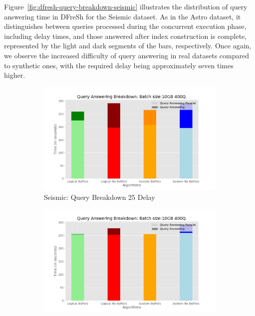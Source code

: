 %
Figure~\ref{fig:dfresh-query-breakdown-seismic} illustrates the distribution of query 
answering time in DFreSh for the Seismic dataset. As in the Astro dataset, it
distinguishes between queries processed during the concurrent execution phase,
including delay times, and those answered after index construction is complete,
represented by the light and dark segments of the bars, respectively. Once again,
we observe the increased difficulty of query answering in real datasets compared to
synthetic ones, with the required delay being approximately seven times higher.

\begin{figure}
	\centering
	\begin{subfigure}[c]{0.45\textwidth}
		\includegraphics[width=1\textwidth]   {figures/Experiments/Dynamic/SEISMIC/25/breakdown_seismic_25.png}
		\caption{Seismic: Query Breakdown 25 Delay}
		\label{fig:actual-query-breakdown-25-seismic}
	\end{subfigure}
	\begin{subfigure}[c]{0.45\textwidth}
		\includegraphics[width=1\textwidth]	 {figures/Experiments/Dynamic/SEISMIC/35/breakdown_seismic_35.png}

\end{subfigure}
\end{figure}
